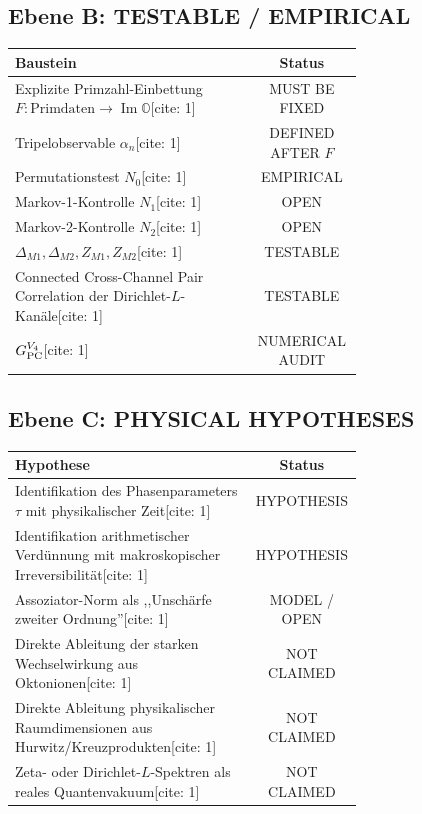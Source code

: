 \documentclass[11pt,a4paper]{article}
\newcommand{\OO}{\mathbb{O}}
\begin{document}
	\subsection*{Ebene B: TESTABLE / EMPIRICAL}
	\begin{center}
		\begin{tabular}{>{\raggedright\arraybackslash}p{0.69\linewidth}|c}
			\toprule
			\textbf{Baustein} & \textbf{Status}\\
			\midrule
			Explizite Primzahl-Einbettung $F:\text{Primdaten}\to\operatorname{Im}\OO$[cite: 1] & MUST BE FIXED\\
			Tripelobservable $\alpha_n$[cite: 1] & DEFINED AFTER $F$\\
			Permutationstest $N_0$[cite: 1] & EMPIRICAL\\
			Markov-1-Kontrolle $N_1$[cite: 1] & OPEN\\
			Markov-2-Kontrolle $N_2$[cite: 1] & OPEN\\
			$\Delta_{M1},\Delta_{M2},Z_{M1},Z_{M2}$[cite: 1] & TESTABLE\\
			Connected Cross-Channel Pair Correlation der Dirichlet-$L$-Kanäle[cite: 1] & TESTABLE\\
			$G_{\rm PC}^{V_4}$[cite: 1] & NUMERICAL AUDIT\\
			\bottomrule
		\end{tabular}
	\end{center}
	
	\subsection*{Ebene C: PHYSICAL HYPOTHESES}
	\begin{center}
		\begin{tabular}{>{\raggedright\arraybackslash}p{0.69\linewidth}|c}
			\toprule
			\textbf{Hypothese} & \textbf{Status}\\
			\midrule
			Identifikation des Phasenparameters $\tau$ mit physikalischer Zeit[cite: 1] & HYPOTHESIS\\
			Identifikation arithmetischer Verdünnung mit makroskopischer Irreversibilität[cite: 1] & HYPOTHESIS\\
			Assoziator-Norm als ,,Unschärfe zweiter Ordnung''[cite: 1] & MODEL / OPEN\\
			Direkte Ableitung der starken Wechselwirkung aus Oktonionen[cite: 1] & NOT CLAIMED\\
			Direkte Ableitung physikalischer Raumdimensionen aus Hurwitz/Kreuzprodukten[cite: 1] & NOT CLAIMED\\
			Zeta- oder Dirichlet-$L$-Spektren als reales Quantenvakuum[cite: 1] & NOT CLAIMED\\
			\bottomrule
		\end{tabular}
	\end{center}
	
\end{document}
